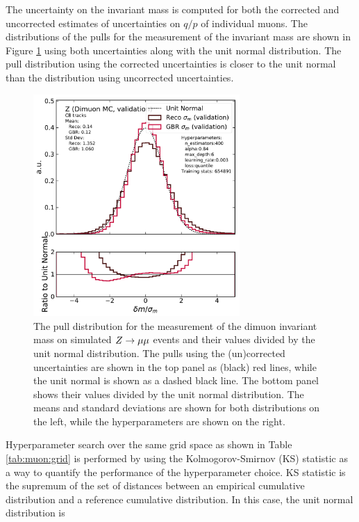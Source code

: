 The uncertainty on the invariant mass is computed for both the corrected
and uncorrected estimates of uncertainties on $q/p$ of individual muons.
The distributions of the pulls for the measurement of the invariant mass
are shown in Figure \ref{fig:muon:std-dimuon} using both uncertainties
along with the unit normal distribution. The pull distribution using the
corrected uncertainties is closer to the unit normal than the distribution
using uncorrected uncertainties.
\begin{figure}[h!]
  \centering
  \includegraphics[width=0.7\textwidth]{figures/muons/vader-std-dimuon}
  \caption[VADER4$\mu$ uncertainty correction on the dimuon dataset]
  {The pull distribution for the measurement of the dimuon invariant mass
  on simulated $Z \rightarrow \mu\mu$ events and their values divided by the unit normal
  distribution. The pulls using the (un)corrected uncertainties are shown in 
  the top panel as (black) red lines, while the unit normal is shown as a
  dashed black line. The bottom panel shows their values divided by the
  unit normal distribution. The means and standard deviations are shown for
  both distributions on the left, while the hyperparameters are shown on
  the right.
  }
  \label{fig:muon:std-dimuon}
\end{figure}
Hyperparameter search over the same grid space as shown in Table
\ref{tab:muon:grid} is performed by using the Kolmogorov-Smirnov (KS)
statistic \cite{ks-test} as a way to quantify the performance of the
hyperparameter choice. KS statistic is the supremum of the set of
distances between an empirical cumulative distribution and a reference
cumulative distribution. In this case, the unit normal distribution is
